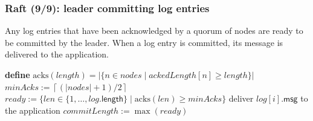 \begin{frame}
    \label{s:raft9}
    \frametitle{Raft (9/9): leader committing log entries}
    \footnotesize
    Any log entries that have been acknowledged by a quorum of nodes are ready to be committed by the leader.
    When a log entry is committed, its message is delivered to the application.\\[1em]
    \begin{algorithmic}
        \State \textbf{define} $\mathrm{acks}(\mathit{length}) = |\{n \in \mathit{nodes} \mid \mathit{ackedLength}[n] \ge \mathit{length}\}|$
        \State
            \State $\mathit{minAcks} := \left\lceil (|\mathit{nodes}| + 1)/2 \right\rceil$
            \State $\mathit{ready} := \{\mathit{len} \in \{1,\dots,\mathit{log}.\mathsf{length}\} \mid \mathrm{acks}(\mathit{len}) \ge \mathit{minAcks}\}$
                    \State deliver $\mathit{log}[i].\mathsf{msg}$ to the application
                \EndFor
                \State $\mathit{commitLength} := \max(\mathit{ready})$
            \EndIf
        \EndFunction
        \State
    \end{algorithmic}
\end{frame}
\label{l:raft9}


